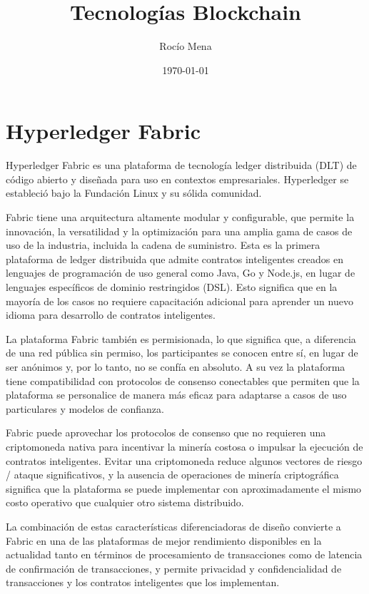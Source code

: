 \documentclass{article}
\title{Tecnologías Blockchain}
\author{Rocío Mena}
\date{\today}
\begin{document}
\maketitle

\section{Hyperledger Fabric}

Hyperledger Fabric es una plataforma de tecnología ledger distribuida (DLT) de código abierto y diseñada para uso en contextos empresariales. Hyperledger se estableció bajo la Fundación Linux y su sólida comunidad. 

Fabric tiene una arquitectura altamente modular y configurable, que permite la innovación, la versatilidad y la optimización para una amplia gama de casos de uso de la industria, incluida la cadena de suministro. Esta es la primera plataforma de ledger distribuida que admite contratos inteligentes creados en lenguajes de programación de uso general como Java, Go y Node.js, en lugar de lenguajes específicos de dominio restringidos (DSL). Esto significa que en la mayoría de los casos no requiere capacitación adicional para aprender un nuevo idioma para desarrollo de contratos inteligentes.

La plataforma Fabric también es permisionada, lo que significa que, a diferencia de una red pública sin permiso, los participantes se conocen entre sí, en lugar de ser anónimos y, por lo tanto, no se confía en absoluto. A su vez la plataforma tiene compatibilidad con protocolos de consenso conectables que permiten que la plataforma se personalice de manera más eficaz para adaptarse a casos de uso particulares y modelos de confianza. 

Fabric puede aprovechar los protocolos de consenso que no requieren una criptomoneda nativa para incentivar la minería costosa o impulsar la ejecución de contratos inteligentes. Evitar una criptomoneda reduce algunos vectores de riesgo / ataque significativos, y la ausencia de operaciones de minería criptográfica significa que la plataforma se puede implementar con aproximadamente el mismo costo operativo que cualquier otro sistema distribuido.

La combinación de estas características diferenciadoras de diseño convierte a Fabric en una de las plataformas de mejor rendimiento disponibles en la actualidad tanto en términos de procesamiento de transacciones como de latencia de confirmación de transacciones, y permite privacidad y confidencialidad de transacciones y los contratos inteligentes que los implementan.
\end{document}
